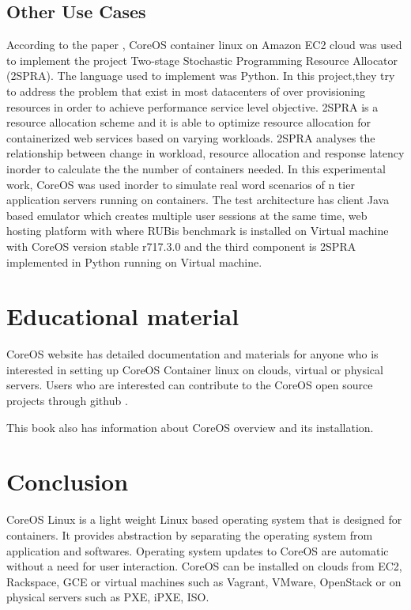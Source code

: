 \documentclass[9pt,twocolumn,twoside]{styles/osajnl}
\begin{document}
\subsection{Other Use Cases}
According to the paper \cite{2SPRA}, CoreOS container linux on Amazon
EC2 cloud was used to implement the project Two-stage Stochastic
Programming Resource Allocator (2SPRA). The language used to implement
was Python. In this project,they try to address the problem that exist
in most datacenters of over provisioning resources in order to achieve
performance service level objective. 2SPRA is a resource allocation
scheme and it is able to optimize resource allocation for
containerized web services based on varying workloads. 2SPRA analyses
the relationship between change in workload, resource allocation and
response latency inorder to calculate the the number of containers
needed. In this experimental work, CoreOS was used inorder to simulate
real word scenarios of n tier application servers running on
containers. The test architecture has client Java based emulator which
creates multiple user sessions at the same time, web hosting platform
with where RUBis benchmark is installed on Virtual machine with CoreOS
version stable r717.3.0 and the third component is 2SPRA implemented
in Python running on Virtual machine.


\section{Educational material} 

CoreOS website \cite{www-coreOSquickstart} has detailed documentation
and materials for anyone who is interested in setting up CoreOS
Container linux on clouds, virtual or physical servers.  Users who are
interested can contribute to the CoreOS open source projects through
github \cite {www-coregit}.

This book \cite{coreOSBook} also has information about CoreOS overview
and its installation.

\section{Conclusion} 
CoreOS Linux is a light weight Linux based operating system that is
designed for containers. It provides abstraction by separating the
operating system from application and softwares. Operating system
updates to CoreOS are automatic without a need for user
interaction. CoreOS can be installed on clouds from EC2, Rackspace,
GCE or virtual machines such as Vagrant, VMware, OpenStack or on
physical servers such as PXE, iPXE, ISO.  
\end{document}
